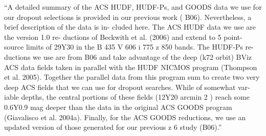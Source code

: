 \documentclass[manuscript]{aastex}
\begin{document}
  ``A detailed summary of the ACS HUDF, HUDF-Ps, and GOODS
    data we use for our dropout selections is provided in our previous
    work ( B06). Nevertheless, a brief description of the data is in-
    cluded here. The ACS HUDF data we use are the version 1.0 re-
    ductions of Beckwith et al. (2006) and extend to 5  point-source
    limits of 29Y30 in the B 435 V 606 i 775 z 850 bands. The HUDF-Ps re-
    ductions we use are from B06 and take advantage of the deep
    (k72 orbit) BViz ACS data fields taken in parallel with the HUDF
    NICMOS program (Thompson et al. 2005). Together the parallel
    data from this program sum to create two very deep ACS fields
    that we can use for dropout searches. While of somewhat var-
    iable depths, the central portions of these fields (12Y20 arcmin 2 )
    reach some 0.6Y0.9 mag deeper than the data in the original ACS
    GOODS program (Giavalisco et al. 2004a). Finally, for the ACS
    GOODS reductions, we use an updated version of those generated
    for our previous z 6 study (B06).'' \cite{bouwens06}
\end{document}
